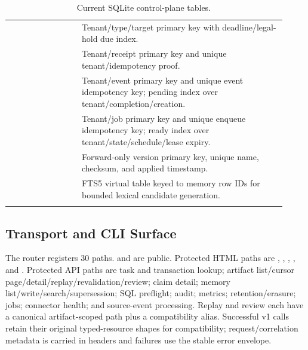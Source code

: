 \begin{longtable}{L{0.24\linewidth}L{0.68\linewidth}}
 & Tenant/type/target primary key with deadline/legal-hold due index. \\
 & Tenant/receipt primary key and unique tenant/idempotency proof. \\
 & Tenant/event primary key and unique event idempotency key; pending index over tenant/completion/creation. \\
 & Tenant/job primary key and unique enqueue idempotency key; ready index over tenant/state/schedule/lease expiry. \\
 & Forward-only version primary key, unique name, checksum, and applied timestamp. \\
 & FTS5 virtual table keyed to memory row IDs for bounded lexical candidate generation. \\
\bottomrule
\caption{Current SQLite control-plane tables.}
\end{longtable}

\subsection{Transport and CLI Surface}

The router registers 30 paths.  and  are public. Protected HTML paths are \code{/}, , , , and . Protected API paths are task and transaction lookup; artifact list/cursor page/detail/replay/revalidation/review; claim detail; memory list/write/search/supersession; SQL preflight; audit; metrics; retention/erasure; jobs; connector health; and source-event processing. Replay and review each have a canonical artifact-scoped path plus a compatibility alias. Successful v1 calls retain their original typed-resource shapes for compatibility; request/correlation metadata is carried in headers and failures use the stable error envelope.

